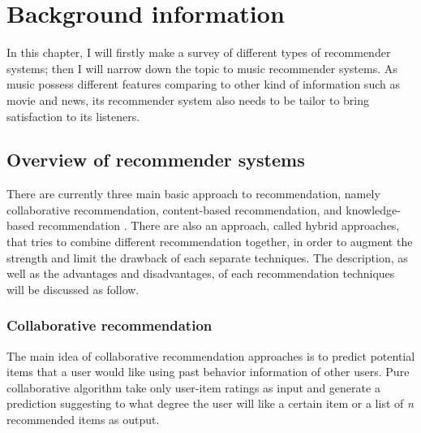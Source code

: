 
\chapter{Background information} %
\label{Chapter2} 




In this chapter, I will firstly make a survey of different types of recommender systems; then I will narrow down the topic to music recommender systems. As music possess different features comparing to other kind of information such as movie and news, its recommender system also needs to be tailor to bring satisfaction to its listeners.

\section{Overview of recommender systems}
There are currently three main basic approach to recommendation, namely collaborative recommendation, content-based recommendation, and knowledge-based recommendation \cite{jannach2010recommender}. There are also an approach, called hybrid approaches, that tries to combine different recommendation together, in order to augment the strength and limit the drawback of each separate techniques. The description, as well as the advantages and disadvantages, of each recommendation techniques will be discussed as follow.

\subsection{Collaborative recommendation}
The main idea of collaborative recommendation approaches is to predict potential items that a user would like using past behavior information of other users. Pure collaborative algorithm take only user-item ratings as input and generate a prediction suggesting to what degree the user will like a certain item or a list of \textit{n} recommended items as output. 

